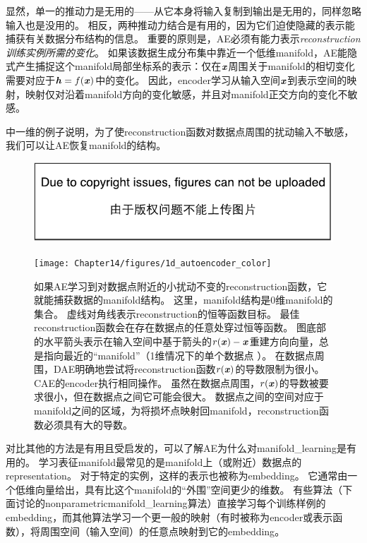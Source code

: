 
显然，单一的推动力是无用的——从它本身将输入复制到输出是无用的，同样忽略输入也是没用的。
相反，两种推动力结合是有用的，因为它们迫使隐藏的表示能捕获有关数据分布结构的信息。
重要的原则是，\gls{AE}必须有能力表示\emph{\gls{reconstruction}训练实例所需的变化}。
如果该数据生成分布集中靠近一个低维\gls{manifold}，\gls{AE}能隐式产生捕捉这个\gls{manifold}局部坐标系的表示：仅在$\boldsymbol{\mathit{x}}$周围关于\gls{manifold}的相切变化需要对应于$\boldsymbol{\mathit{h}}=f(\boldsymbol{\mathit{x}})$中的变化。
因此，\gls{encoder}学习从输入空间$\boldsymbol{\mathit{x}}$到表示空间的映射，映射仅对沿着\gls{manifold}方向的变化敏感，并且对\gls{manifold}正交方向的变化不敏感。


中一维的例子说明，为了使\gls{reconstruction}函数对数据点周围的扰动输入不敏感，我们可以让\gls{AE}恢复\gls{manifold}的结构。

\begin{figure}[!htb]
\ifOpenSource
\centerline{\includegraphics{figure.pdf}}
\else
\centerline{\texttt{[image: Chapter14/figures/1d\_autoencoder\_color]}}
\fi
\caption{如果\gls{AE}学习到对数据点附近的小扰动不变的\gls{reconstruction}函数，它就能捕获数据的\gls{manifold}结构。
这里，\gls{manifold}结构是0维\gls{manifold}的集合。
虚线对角线表示\gls{reconstruction}的恒等函数目标。 
最佳\gls{reconstruction}函数会在存在数据点的任意处穿过恒等函数。
图底部的水平箭头表示在输入空间中基于箭头的$r(\boldsymbol{\mathit{x}})-\boldsymbol{\mathit{x}}$重建方向向量，总是指向最近的``\gls{manifold}''（1维情况下的单个数据点 ）。
在数据点周围，\gls{DAE}明确地尝试将\gls{reconstruction}函数$r(\boldsymbol{\mathit{x}})$的导数限制为很小。
\gls{CAE}的\gls{encoder}执行相同操作。
虽然在数据点周围，$r(\boldsymbol{\mathit{x}})$的导数被要求很小，但在数据点之间它可能会很大。
数据点之间的空间对应于\gls{manifold}之间的区域，为将损坏点映射回\gls{manifold}，\gls{reconstruction}函数必须具有大的导数。
} \label{fig:chap14_1d_autoencoder_color}
\end{figure}


对比其他的方法是有用且受启发的，可以了解\gls{AE}为什么对\gls{manifold_learning}是有用的。
学习表征\gls{manifold}最常见的是\gls{manifold}上（或附近）数据点的\gls{representation}。
对于特定的实例，这样的表示也被称为\gls{embedding}。
它通常由一个低维向量给出，具有比这个\gls{manifold}的``外围''空间更少的维数。
有些算法（下面讨论的\gls{nonparametric}\gls{manifold_learning}算法）直接学习每个训练样例的\gls{embedding}，而其他算法学习一个更一般的映射（有时被称为\gls{encoder}或表示函数），将周围空间（输入空间）的任意点映射到它的\gls{embedding}。


